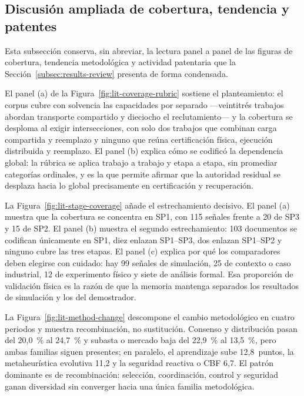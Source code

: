 \subsection{Discusión ampliada de cobertura, tendencia y patentes}
\label{app:review-results-full}

Esta subsección conserva, sin abreviar, la lectura panel a panel de las
figuras de cobertura, tendencia metodológica y actividad patentaria que la
Sección~\ref{subsec:results-review} presenta de forma condensada.

El panel (a) de la Figura~\ref{fig:lit-coverage-rubric} sostiene el planteamiento: el
corpus cubre con solvencia las capacidades por separado ---veintitrés trabajos abordan
transporte compartido y dieciocho el reclutamiento--- y la cobertura se desploma al
exigir intersecciones, con solo dos trabajos que combinan carga compartida y reemplazo y
ninguno que reúna certificación física, ejecución distribuida y reemplazo. El panel (b)
explica cómo se codificó la dependencia global: la rúbrica se aplica trabajo a trabajo y
etapa a etapa, sin promediar categorías ordinales, y es la que permite afirmar que la
autoridad residual se desplaza hacia lo global precisamente en certificación y
recuperación.

La Figura~\ref{fig:lit-stage-coverage} añade el estrechamiento decisivo. El panel (a)
muestra que la cobertura se concentra en SP1, con 115 señales frente a 20 de SP3 y 15 de
SP2. El panel (b) muestra el segundo estrechamiento: 103 documentos se codifican
únicamente en SP1, diez enlazan SP1--SP3, dos enlazan SP1--SP2 y ninguno cubre las tres
etapas. El panel (c) explica por qué los comparadores deben elegirse con cuidado: hay 99
señales de simulación, 25 de contexto o caso industrial, 12 de experimento físico y
siete de análisis formal. Esa proporción de validación física es la razón de que la
memoria mantenga separados los resultados de simulación y los del demostrador.

La Figura~\ref{fig:lit-method-change} descompone el cambio metodológico en cuatro
periodos y muestra recombinación, no sustitución. Consenso y distribución pasan del
20,0~\% al 24,7~\% y subasta o mercado baja del 22,9~\% al 13,5~\%, pero ambas familias
siguen presentes; en paralelo, el aprendizaje sube 12,8~puntos, la metaheurística
evolutiva 11,2 y la seguridad reactiva o CBF 6,7. El patrón dominante es de
recombinación: selección, coordinación, control y seguridad ganan diversidad sin
converger hacia una única familia metodológica.


